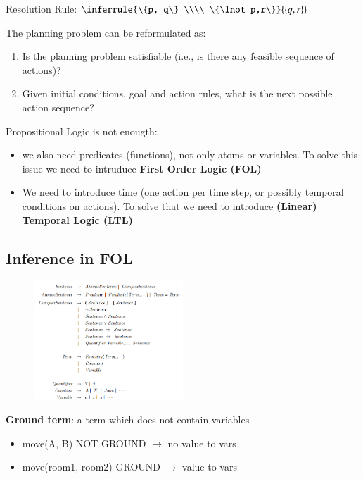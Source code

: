Resolution Rule: $\inferrule{\{p, q\} \\\\ \{\lnot p,r\}}{\{q, r\}}$

The planning problem can be reformulated as:
\begin{enumerate}
    \item Is the planning problem satisfiable (i.e., is there any feasible sequence of actions)?
    \item Given initial conditions, goal and action rules, what is the next possible action sequence?
\end{enumerate}

Propositional Logic is not enougth:
\begin{itemize}
    \item we also need predicates (functions), not only atoms or variables. To solve this issue we need to intruduce \textbf{First Order Logic (FOL)}
    \item We need to introduce time (one action per time step, or possibly temporal conditions on actions). To solve that we need to introduce \textbf{(Linear) Temporal Logic (LTL)}
\end{itemize}

\subsection{Inference in FOL}
\begin{figure}[H]
    \includegraphics[width=0.5\textwidth]{img/FOL.png}
    \centering
\end{figure}

\textbf{Ground term}: a term which does not contain variables
\begin{itemize}
    \item move(A, B) NOT GROUND $\rightarrow$ no value to vars
    \item move(room1, room2) GROUND $\rightarrow$ value to vars
\end{itemize}

